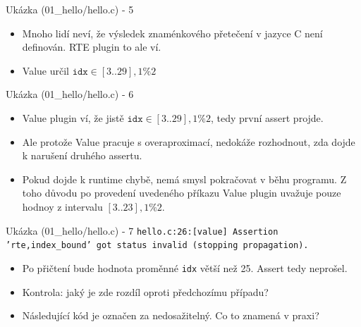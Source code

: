 \documentclass[11pt]{beamer}
\begin{document}
\begin{frame}{Ukázka (01\_hello/hello.c) - 5}
	\lstFirstValueMainPartThree
	\begin{itemize}
			\item Mnoho lidí neví, že výsledek znaménkového přetečení 
				v jazyce C není definován. RTE plugin to ale ví.
			\item Value určil \( \texttt{idx} \in [3..29],1 \%2 \)

	\end{itemize}
\end{frame}


\begin{frame}{Ukázka (01\_hello/hello.c) - 6}
	\lstFirstValueMainPartFour

	\begin{itemize}
			\item Value plugin ví, že jistě \( \texttt{idx} \in [3..29],1 \%2 \),
				tedy první assert projde.
			\item Ale protože Value pracuje s overaproximací, nedokáže rozhodnout,
				zda dojde k narušení druhého assertu.
			\item Pokud dojde k runtime chybě, nemá smysl pokračovat v běhu programu.
				Z toho důvodu po provedení uvedeného příkazu Value plugin uvažuje
				pouze hodnoy z intervalu \( [3..23],1\%2 \).
	\end{itemize}
\end{frame}


\begin{frame}{Ukázka (01\_hello/hello.c) - 7}
	\lstFirstValueMainPartFive
	\texttt{hello.c:26:[value] Assertion 'rte,index\_bound' got status invalid
	(stopping propagation).}
	\begin{itemize}
		\item Po přičtení bude hodnota proměnné \texttt{idx} větší než 25.
			Assert tedy neprošel.
		\pause \item Kontrola: jaký je zde rozdíl oproti předchozímu případu?
		\pause \item Následující kód je označen za nedosažitelný. Co to znamená v praxi?
	\end{itemize}
\end{frame}
\end{document}
